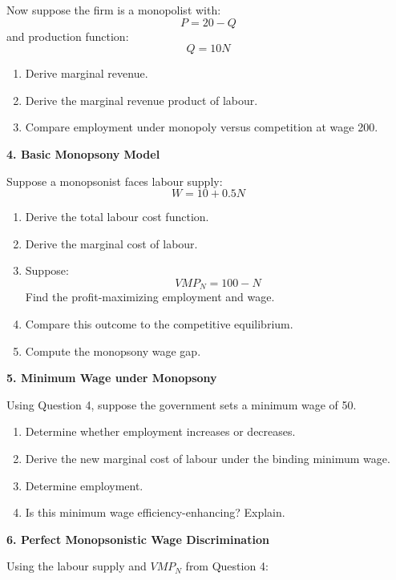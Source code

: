 \documentclass[12pt]{article}
\begin{document}
Now suppose the firm is a monopolist with:
\[
P = 20 - Q
\]
and production function:
\[
Q = 10N
\]

\begin{enumerate}
\item[(c)] Derive marginal revenue.
\item[(d)] Derive the marginal revenue product of labour.
\item[(e)] Compare employment under monopoly versus competition at wage 200.
\end{enumerate}


\vspace{1em}

\textbf{4. Basic Monopsony Model}

Suppose a monopsonist faces labour supply:
\[
W = 10 + 0.5N
\]

\begin{enumerate}
\item[(a)] Derive the total labour cost function.
\item[(b)] Derive the marginal cost of labour.
\item[(c)] Suppose:
\[
VMP_N = 100 - N
\]
Find the profit-maximizing employment and wage.
\item[(d)] Compare this outcome to the competitive equilibrium.
\item[(e)] Compute the monopsony wage gap.
\end{enumerate}


\vspace{1em}

\newpage
\textbf{5. Minimum Wage under Monopsony}

Using Question 4, suppose the government sets a minimum wage of 50.

\begin{enumerate}
\item[(a)] Determine whether employment increases or decreases.
\item[(b)] Derive the new marginal cost of labour under the binding minimum wage.
\item[(c)] Determine employment.
\item[(d)] Is this minimum wage efficiency-enhancing? Explain.
\end{enumerate}


\vspace{1em}

\textbf{6. Perfect Monopsonistic Wage Discrimination}

Using the labour supply and $VMP_N$ from Question 4:
\end{document}
